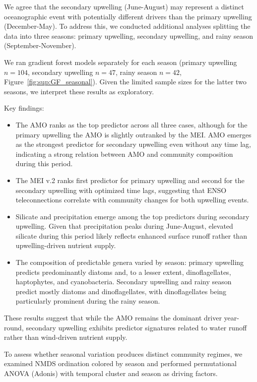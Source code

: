 \documentclass[12pt,english]{reviewresponse}
\begin{document}
\begin{revresponse}
	We agree that the secondary upwelling (June-August) may represent a distinct oceanographic event with potentially different drivers than the primary upwelling (December-May). To address this, we conducted additional analyses splitting the data into three seasons: primary upwelling, secondary upwelling, and rainy season (September-November).
    
    We ran gradient forest models separately for each season (primary upwelling $n=104$, secondary upwelling $n=47$, rainy season $n=42$, Figure~\ref{fig:sup:GF_seasonal}). Given the limited sample sizes for the latter two seasons, we interpret these results as exploratory.
    
    Key findings:
    \begin{itemize}
        \item The AMO ranks as the top predictor across all three cases, although for the primary upwelling the AMO is slightly outranked by the MEI. AMO emerges as the strongest predictor for secondary upwelling even without any time lag, indicating a strong relation between AMO and community composition during this period.
        \item The MEI v.2 ranks first predictor for primary upwelling and second for the secondary upwelling with optimized time lags, suggesting that ENSO teleconnections correlate with community changes for both upwelling events.
        \item Silicate and precipitation emerge among the top predictors during secondary upwelling. Given that precipitation peaks during June-August, elevated silicate during this period likely reflects enhanced surface runoff rather than upwelling-driven nutrient supply.
        \item The composition of predictable genera varied by season: primary upwelling predicts predominantly diatoms and, to a lesser extent, dinoflagellates, haptophytes, and cyanobacteria. Secondary upwelling and rainy season predict mostly diatoms and dinoflagellates, with dinoflagellates being particularly prominent during the rainy season.
    \end{itemize}
    
    These results suggest that while the AMO remains the dominant driver year-round, secondary upwelling exhibits predictor signatures related to water runoff rather than wind-driven nutrient supply.
    
    
    To assess whether seasonal variation produces distinct community regimes, we examined NMDS ordination colored by season and performed permutational ANOVA (Adonis) with temporal cluster and season as driving factors.
    

\end{revresponse}
\end{document}
